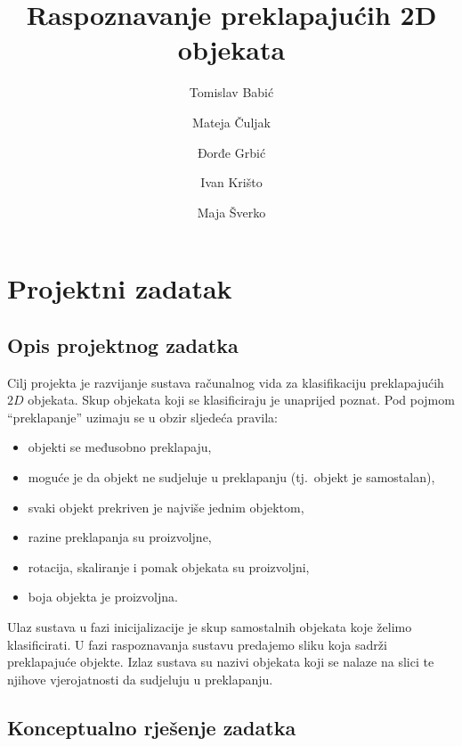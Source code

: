 \documentclass[lmodern, utf8, seminar, numeric]{fer}
\begin{document}
\title{Raspoznavanje preklapajućih 2D objekata}

\author{Tomislav Babić \and Mateja Čuljak \and Đorđe Grbić \and Ivan Krišto \and Maja Šverko}

\maketitle

\tableofcontents


\chapter{Projektni zadatak}

\section{Opis projektnog zadatka}

Cilj projekta je razvijanje sustava računalnog vida za klasifikaciju
preklapajućih $2D$ objekata. Skup objekata koji se klasificiraju je unaprijed
poznat. Pod pojmom ``preklapanje'' uzimaju se u obzir sljedeća pravila:

\begin{itemize}
\item objekti se međusobno preklapaju,
\item moguće je da objekt ne sudjeluje u preklapanju (tj.\ objekt je samostalan),
\item svaki objekt prekriven je najviše jednim objektom,
\item razine preklapanja su proizvoljne,
\item rotacija, skaliranje i pomak objekata su proizvoljni,
\item boja objekta je proizvoljna.
\end{itemize}
Ulaz sustava u fazi inicijalizacije je skup samostalnih objekata koje želimo
klasificirati. U fazi raspoznavanja sustavu predajemo sliku koja sadrži
preklapajuće objekte. Izlaz sustava su nazivi objekata koji se nalaze na slici
te njihove vjerojatnosti da sudjeluju u preklapanju.


\section{Konceptualno rješenje zadatka}
\end{document}
